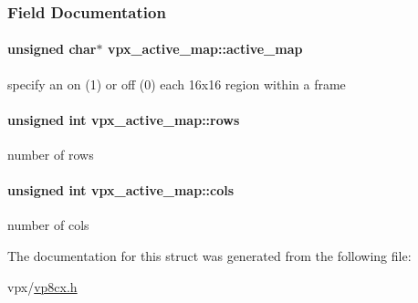 \subsubsection{\-Field \-Documentation}
\hypertarget{structvpx__active__map_a6e5e092e766ae3f65d280c68c9f6df82}{
\paragraph[{active\-\_\-map}]{\setlength{\rightskip}{0pt plus 5cm}unsigned char$\ast$ {\bf vpx\-\_\-active\-\_\-map\-::active\-\_\-map}}}
\label{structvpx__active__map_a6e5e092e766ae3f65d280c68c9f6df82}
specify an on (1) or off (0) each 16x16 region within a frame \hypertarget{structvpx__active__map_a29424c92ff201f97db9bf62d16dfab4d}{
\paragraph[{rows}]{\setlength{\rightskip}{0pt plus 5cm}unsigned int {\bf vpx\-\_\-active\-\_\-map\-::rows}}}
\label{structvpx__active__map_a29424c92ff201f97db9bf62d16dfab4d}
number of rows \hypertarget{structvpx__active__map_a310edb5efc62d596b2c276e3f7d1b42a}{
\paragraph[{cols}]{\setlength{\rightskip}{0pt plus 5cm}unsigned int {\bf vpx\-\_\-active\-\_\-map\-::cols}}}
\label{structvpx__active__map_a310edb5efc62d596b2c276e3f7d1b42a}
number of cols 

\-The documentation for this struct was generated from the following file\-:\begin{DoxyCompactItemize}
\item 
vpx/\hyperlink{vp8cx_8h}{vp8cx.\-h}\end{DoxyCompactItemize}
